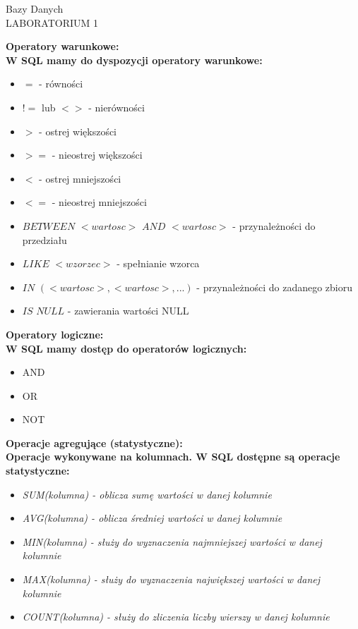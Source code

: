 \documentclass[a4paper,12pt]{article}
\newcommand{\h}[1]{\noindent \bf #1 \rm \\ \noindent}
\newcommand{\italic}[1]{\it #1 \rm}
\begin{document}
\begin{center}
	\LARGE
	Bazy Danych \\
	\large
	LABORATORIUM 1 
\end{center}
\vspace{1cm}

\h{Operatory warunkowe:}
W SQL mamy do dyspozycji operatory warunkowe:
\begin{itemize}
	\item $=$ - równości
	\item $!=$ lub $<>$ - nierówności
	\item $>$ -  ostrej większości
	\item $>=$ - nieostrej większości
	\item $<$ - ostrej mniejszości
	\item $<=$ - nieostrej mniejszości 
	\item $BETWEEN$ $<wartosc>$ $AND$ $<wartosc>$ - przynależności do przedziału
	\item $LIKE$ $<wzorzec>$ - spełnianie wzorca
	\item $IN$ $(<wartosc>, <wartosc>, ...)$ - przynależności do zadanego zbioru
	\item $IS$ $NULL$ - zawierania wartości NULL
\end{itemize}
\vspace{5mm}

\h{Operatory logiczne:}
W SQL mamy dostęp do operatorów logicznych:
\begin{itemize}
	\item AND
	\item OR
	\item NOT
\end{itemize}
\vspace{5mm}

\h{Operacje agregujące (statystyczne):}
Operacje wykonywane na kolumnach. W SQL dostępne są operacje statystyczne:
\begin{itemize}
	\item \italic{SUM(kolumna)} - oblicza sumę wartości w danej kolumnie
	\item \italic{AVG(kolumna)} - oblicza średniej wartości w danej kolumnie
	\item \italic{MIN(kolumna)} - służy do wyznaczenia najmniejszej wartości w danej kolumnie
	\item \italic{MAX(kolumna)} - służy do wyznaczenia największej wartości w danej kolumnie
	\item \italic{COUNT(kolumna)} - służy do zliczenia liczby wierszy w danej kolumnie
\end{itemize}
\vspace{5mm}
\end{document}
